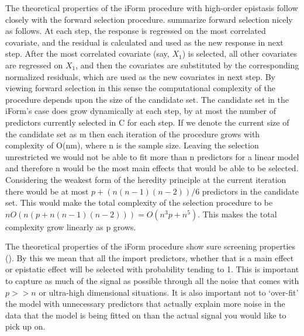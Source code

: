\documentclass[11pt,]{book}
\theoremstyle{definition}
\theoremstyle{definition}
\theoremstyle{remark}
\begin{document}
The theoretical properties of the iForm procedure with high-order
epistasis follow closely with the forward selection procedure.
\cite{hao2014interaction} summarize forward selection nicely as follows.
At each step, the response is regressed on the most correlated
covariate, and the residual is calculated and used as the new response
in next step. After the most correlated covariate (say, \(X_1\)) is
selected, all other covariates are regressed on \(X_1\), and then the
covariates are substituted by the corresponding normalized residuals,
which are used as the new covariates in next step. By viewing forward
selection in this sense the computational complexity of the procedure
depends upon the size of the candidate set. The candidate set in the
iForm's case does grow dynamically at each step, by at most the number
of predictors currently selected in C for each step. If we denote the
current size of the candidate set as m then each iteration of the
procedure grows with complexity of O(nm), where n is the sample size.
Leaving the selection unrestricted we would not be able to fit more than
n predictors for a linear model and therefore n would be the most main
effects that would be able to be selected. Considering the weakest form
of the heredity principle at the current iteration there would be at
most \(p + (n(n-1)(n-2))/6\) predictors in the candidate set. This would
make the total complexity of the selection procedure to be
\(nO(n(p+n(n-1)(n-2))) = O(n^3 p+n^5)\). This makes the total complexity
grow linearly as p grows.

The theoretical properties of the iForm procedure show sure screening
properties (\cite{fan2008sure}). By this we mean that all the import
predictors, whether that is a main effect or epistatic effect will be
selected with probability tending to 1. This is important to capture as
much of the signal as possible through all the noise that comes with
\(p >> n\) or ultra-high dimensional situations. It is also important
not to `over-fit' the model with unnecessary predictors that actually
explain more noise in the data that the model is being fitted on than
the actual signal you would like to pick up on.
\end{document}
